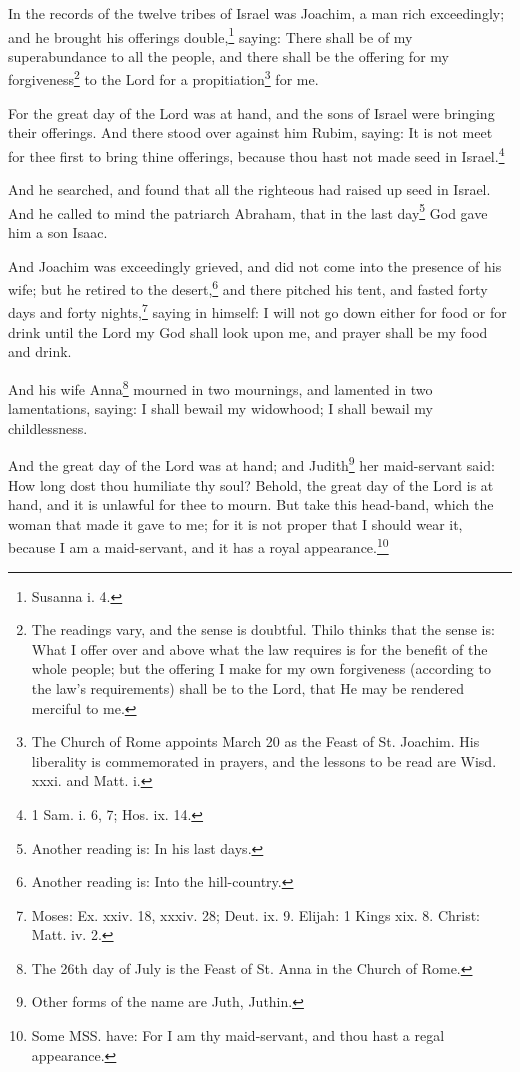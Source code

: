 \pstart
{}

\pend\pstart
In the records of the twelve tribes of Israel was Joachim, a man rich exceedingly; and he brought his offerings double,\footnote{Susanna i. 4.} saying: There shall be of my superabundance to all the people, and there shall be the offering for my forgiveness\footnote{The readings vary, and the sense is doubtful. Thilo thinks that the sense is: What I offer over and above what the law requires is for the benefit of the whole people; but the offering I make for my own forgiveness (according to the law's requirements) shall be to the Lord, that He may be rendered merciful to me.} to the Lord for a propitiation\footnote{The Church of Rome appoints March 20 as the Feast of St. Joachim. His liberality is commemorated in prayers, and the lessons to be read are Wisd. xxxi. and Matt. i.} for me.

\pend\pstart
For the great day of the Lord was at hand, and the sons of Israel were bringing their offerings. And there stood over against him Rubim, saying: It is not meet for thee first to bring thine offerings, because thou hast not made seed in Israel.\footnote{1 Sam. i. 6, 7; Hos. ix. 14.}

\pend\pstart
And he searched, and found that all the righteous had raised up seed in Israel. And he called to mind the patriarch Abraham, that in the last day\footnote{Another reading is: In his last days.} God gave him a son Isaac.

\pend\pstart
And Joachim was exceedingly grieved, and did not come into the presence of his wife; but he retired to the desert,\footnote{Another reading is: Into the hill-country.} and there pitched his tent, and fasted forty days and forty nights,\footnote{Moses: Ex. xxiv. 18, xxxiv. 28; Deut. ix. 9. Elijah: 1 Kings xix. 8. Christ: Matt. iv. 2.} saying in himself: I will not go down either for food or for drink until the Lord my God shall look upon me, and prayer shall be my food and drink.

\pend\pstart
{}

\pend\pstart
And his wife Anna\footnote{The 26th day of July is the Feast of St. Anna in the Church of Rome.} mourned in two mournings, and lamented in two lamentations, saying: I shall bewail my widowhood; I shall bewail my childlessness.

\pend\pstart
And the great day of the Lord was at hand; and Judith\footnote{Other forms of the name are Juth, Juthin.} her maid-servant said: How long dost thou humiliate thy soul? Behold, the great day of the Lord is at hand, and it is unlawful for thee to mourn. But take this head-band, which the woman that made it gave to me; for it is not proper that I should wear it, because I am a maid-servant, and it has a royal appearance.\footnote{Some MSS. have: For I am thy maid-servant, and thou hast a regal appearance.}

